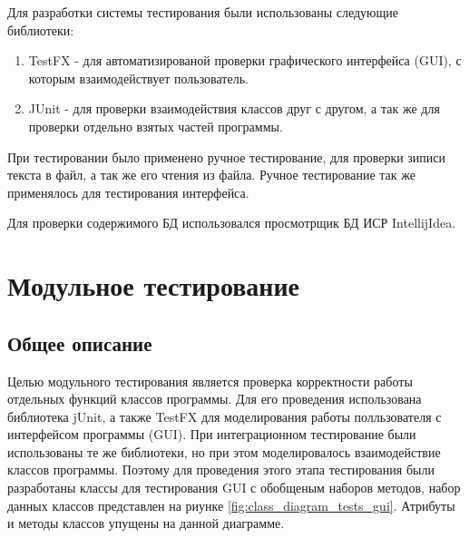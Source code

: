 \documentclass[a4paper,12pt]{article}
\begin{document}
Для разработки системы тестирования были использованы следующие библиотеки:
\begin{enumerate}
\item TestFX - для автоматизированой проверки графического интерфейса (GUI), с которым взаимодействует пользователь.
\item JUnit - для проверки взаимодействия классов друг с другом, а так же для проверки отдельно взятых частей программы.
\end{enumerate}
\par При тестировании было применено ручное тестирование, для проверки зиписи текста в файл, а так же его чтения из файла. Ручное тестирование так же применялось для тестирования интерфейса. 
\par Для проверки содержимого БД использовался просмотрщик БД ИСР IntellijIdea.

\newpage \section{Модульное тестирование}
\subsection{Общее описание}
Целью модульного тестирования является проверка корректности работы отдельных функций классов программы.
Для его проведения использована библиотека jUnit, а также TestFX для моделирования работы полльзователя с интерфейсом программы (GUI). При интеграционном тестирование были использованы те же библиотеки, но при этом моделировалось взаимодействие классов программы. Поэтому для проведения этого этапа тестирования были разработаны классы для тестирования GUI с обобщеным наборов методов, набор данных классов представлен на риунке \ref{fig:class_diagram_tests_gui}. Атрибуты и методы классов упущены на данной диаграмме.
\end{document}
